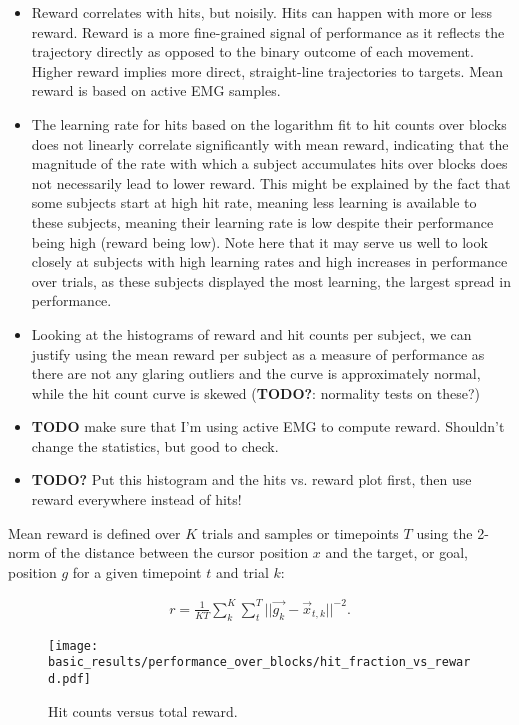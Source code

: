 \documentclass[../main.tex]{subfiles}
\begin{document}
\begin{itemize}
    \setlength\itemsep{0em}
    \item Reward correlates with hits, but noisily. Hits can happen with more or less reward. Reward is a more fine-grained signal of performance as it reflects the trajectory directly as opposed to the binary outcome of each movement. Higher reward implies more direct, straight-line trajectories to targets. Mean reward is based on active EMG samples.
    \item The learning rate for hits based on the logarithm fit to hit counts over blocks does not linearly correlate significantly with mean reward, indicating that the magnitude of the rate with which a subject accumulates hits over blocks does not necessarily lead to lower reward. This might be explained by the fact that some subjects start at high hit rate, meaning less learning is available to these subjects, meaning their learning rate is low despite their performance being high (reward being low). Note here that it may serve us well to look closely at subjects with high learning rates and high increases in performance over trials, as these subjects displayed the most learning, the largest spread in performance.
    \item Looking at the histograms of reward and hit counts per subject, we can justify using the mean reward per subject as a measure of performance as there are not any glaring outliers and the curve is approximately normal, while the hit count curve is skewed (\textbf{TODO?}: normality tests on these?)
    \item \textbf{TODO} make sure that I'm using active EMG to compute reward. Shouldn't change the statistics, but good to check.
    \item \textbf{TODO?} Put this histogram and the hits vs. reward plot first, then use reward everywhere instead of hits! 
\end{itemize}

Mean reward is defined over $K$ trials and samples or timepoints $T$ using the 2-norm of the distance between the cursor position $x$ and the target, or goal, position $g$ for a given timepoint $t$ and trial $k$:

\begin{align}
    r = \frac{1}{KT}\sum_k^K\sum_t^T{|| \vec{g_k} - \vec{x}_{t,k} ||^{-2}}.
    \label{eq:reward}
\end{align}

\begin{figure}[H]%
    \centering
    \texttt{[image: basic\_results/performance\_over\_blocks/hit\_fraction\_vs\_reward.pdf]}
    \caption[Hits versus reward]{Hit counts versus total reward.}\label{fig:hit_fraction_vs_reward}
\end{figure}
\end{document}
